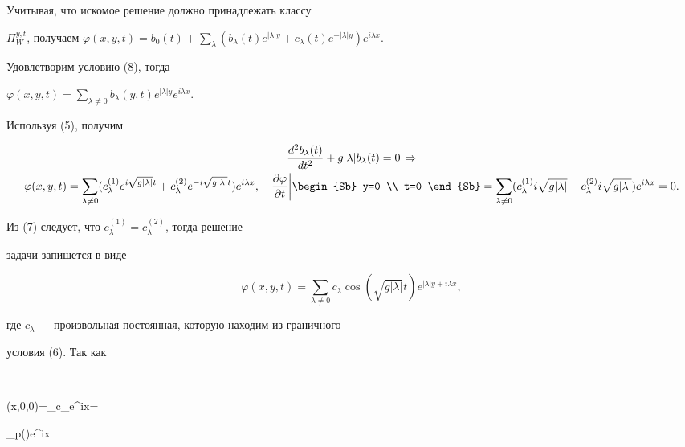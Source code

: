 Учитывая, что искомое решение должно принадлежать классу 


$\Pi^{y,t}_W$, получаем $\varphi(x,y,t)=b_0(t)+\sum\limits_\lambda 


(b_\lambda(t)e^{|\lambda|y}+c_\lambda(t)e^{-|\lambda|y}) 


e^{i\lambda x}$. 


Удовлетворим условию (8), тогда 


$\varphi(x,y,t)=\sum\limits_{\lambda\ne0}b_\lambda(y,t) 


e^{|\lambda|y}e^{i\lambda x}$. 


Используя (5), получим 


\begin{multline*} 


\frac{d^2b_\lambda(t)}{d t^2}+g|\lambda|b_\lambda(t)=0\,\Rightarrow \\ 


\varphi(x,y,t)=\sum_{\lambda\ne0}(c^{(1)}_\lambda 


e^{i\sqrt{g|\lambda|}t}+c^{(2)}_\lambda 


e^{-i\sqrt{g|\lambda|}t})e^{i\lambda x},\quad 


\frac{\partial\varphi}{\partial t}\bigg| 


\begin{Sb} y=0 \\ t=0 \end{Sb} 


=\sum_{\lambda\ne0}(c^{(1)}_\lambda i\sqrt{g|\lambda|}- 


c^{(2)}_\lambda i\sqrt{g|\lambda|})e^{i\lambda x}=0. 


\end{multline*} 


Из (7) следует, что $c^{(1)}_\lambda=c^{(2)}_\lambda$, тогда решение 


задачи запишется в виде 


$$ 


\varphi(x,y,t)=\sum_{\lambda\ne0}c_\lambda\cos 


(\sqrt{g|\lambda|}t)e^{|\lambda|y+i\lambda x}, 


$$ 


где $c_\lambda$ --- произвольная постоянная, которую находим из граничного 


условия (6). Так как 


$$ 


\varphi(x,0,0)=\sum_{\lambda{}}c_\lambda e^{i\lambda x}= 


\sum_{\lambda{}}p(\lambda)e^{i\lambda x}\, 


